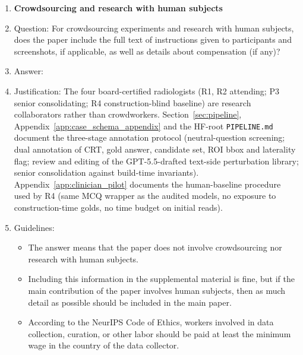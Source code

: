 \begin{enumerate}
\item {\bf Crowdsourcing and research with human subjects}
    \item[] Question: For crowdsourcing experiments and research with human subjects, does the paper include the full text of instructions given to participants and screenshots, if applicable, as well as details about compensation (if any)?
    \item[] Answer: \answerYes{}
    \item[] Justification: The four board-certified radiologists (\textsc{R1}, \textsc{R2} attending; \textsc{P3} senior consolidating; \textsc{R4} construction-blind baseline) are research collaborators rather than crowdworkers. Section~\ref{sec:pipeline}, Appendix~\ref{app:case_schema_appendix} and the HF-root \texttt{PIPELINE.md} document the three-stage annotation protocol (neutral-question screening; dual annotation of CRT, gold answer, candidate set, ROI bbox and laterality flag; review and editing of the GPT-5.5-drafted text-side perturbation library; senior consolidation against build-time invariants). Appendix~\ref{app:clinician_pilot} documents the human-baseline procedure used by \textsc{R4} (same MCQ wrapper as the audited models, no exposure to construction-time golds, no time budget on initial reads).
    \item[] Guidelines:
    \begin{itemize}
        \item The answer \answerNA{} means that the paper does not involve crowdsourcing nor research with human subjects.
        \item Including this information in the supplemental material is fine, but if the main contribution of the paper involves human subjects, then as much detail as possible should be included in the main paper.
        \item According to the NeurIPS Code of Ethics, workers involved in data collection, curation, or other labor should be paid at least the minimum wage in the country of the data collector.
    \end{itemize}


\end{enumerate}
